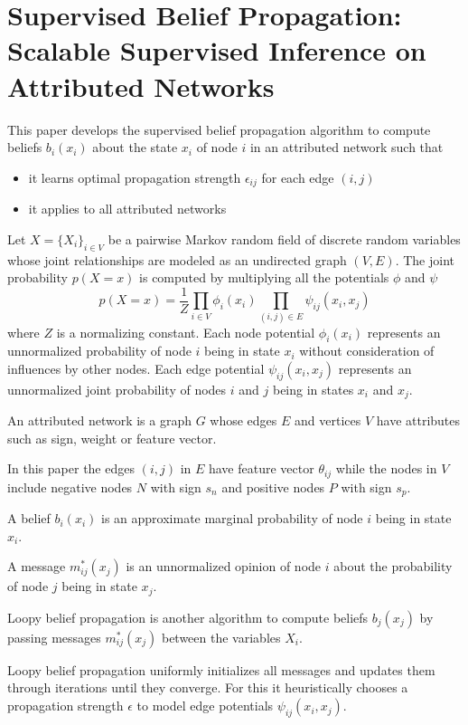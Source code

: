 \documentclass[12pt]{amsart}
\theoremstyle{definition}
\begin{document}
\section{Supervised Belief Propagation: Scalable Supervised Inference on Attributed Networks} This paper \cite{SBP} develops the supervised belief propagation algorithm to compute beliefs $b_i(x_i)$ about the state $x_i$ of node $i$ in an attributed network such that
\begin{itemize}
\item it learns optimal propagation strength $\epsilon_{ij}$ for each edge $(i, j)$
\item it applies to all attributed networks
\end{itemize}

Let $X = \{X_i\}_{i \in V}$ be a pairwise Markov random field of discrete random variables whose joint relationships are modeled as an undirected graph $(V, E)$. The joint probability $p(X = x)$ is computed by multiplying all the potentials $\phi$ and $\psi$
$$p(X = x) = \frac{1}{Z} \prod \limits_{i \in V} \phi_i(x_i) \prod \limits_{(i, j) \in E} \psi_{ij}(x_i, x_j)$$
where $Z$ is a normalizing constant. Each node potential $\phi_i(x_i)$ represents an unnormalized probability of node $i$ being in state $x_i$ without consideration of influences by other nodes. Each edge potential $\psi_{ij}(x_i, x_j)$ represents an unnormalized joint probability of nodes $i$ and $j$ being in states $x_i$ and $x_j$.

\dfn An attributed network is a graph $G$ whose edges $E$ and vertices $V$ have attributes such as sign, weight or feature vector.

In this paper the edges $(i, j)$ in $E$ have feature vector $\theta_{ij}$ while the nodes in $V$ include negative nodes $N$ with sign $s_n$ and positive nodes $P$ with sign $s_p$.

\dfn A belief $b_i(x_i)$ is an approximate marginal probability of node $i$ being in state $x_i$.

\dfn A message $m_{ij}^{\ast}(x_j)$ is an unnormalized opinion of node $i$ about the probability of node $j$ being in state $x_j$.

\dfn Loopy belief propagation is another algorithm to compute beliefs $b_j(x_j)$ by passing messages $m_{ij}^{\ast}(x_j)$ between the variables $X_i$.

Loopy belief propagation uniformly initializes all messages and updates them through iterations until they converge. For this it heuristically chooses a propagation strength $\epsilon$  to model edge potentials $\psi_{ij}(x_i, x_j)$.
\end{document}
